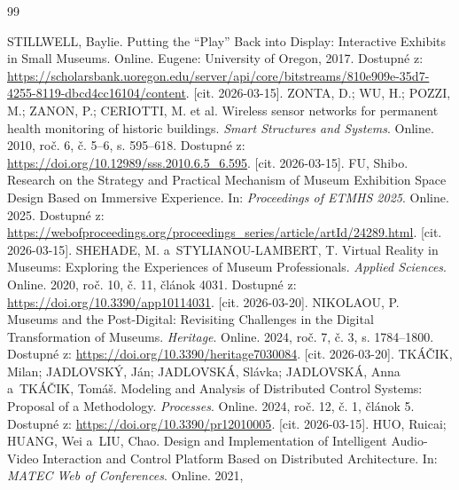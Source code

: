 \raggedbottom %
\begin{thebibliography}{99}

    STILLWELL, Baylie.
    Putting the ``Play'' Back into Display: Interactive Exhibits
    in Small Museums. Online.
    Eugene: University of Oregon, 2017.
    Dostupné z: \url{https://scholarsbank.uoregon.edu/server/api/core/bitstreams/810e909e-35d7-4255-8119-dbcd4cc16104/content}. [cit. 2026-03-15].
    ZONTA, D.; WU, H.; POZZI, M.; ZANON, P.; CERIOTTI, M. et al.
    Wireless sensor networks for permanent health monitoring of
    historic buildings.
    \textit{Smart Structures and Systems}. Online. 2010,
    roč. 6, č. 5--6, s. 595--618.
    Dostupné z: \url{https://doi.org/10.12989/sss.2010.6.5_6.595}. [cit. 2026-03-15].
    FU, Shibo.
    Research on the Strategy and Practical Mechanism of Museum
    Exhibition Space Design Based on Immersive Experience.
    In: \textit{Proceedings of ETMHS 2025}. Online. 2025.
    Dostupné z: \url{https://webofproceedings.org/proceedings_series/article/artId/24289.html}. [cit. 2026-03-15].
    SHEHADE, M. a~STYLIANOU-LAMBERT, T.
    Virtual Reality in Museums: Exploring the Experiences of
    Museum Professionals.
    \textit{Applied Sciences}. Online. 2020, roč. 10, č. 11,
    článok 4031.
    Dostupné z: \url{https://doi.org/10.3390/app10114031}. [cit. 2026-03-20].
    NIKOLAOU, P.
    Museums and the Post-Digital: Revisiting Challenges in the
    Digital Transformation of Museums.
    \textit{Heritage}. Online. 2024, roč. 7, č. 3,
    s. 1784--1800.
    Dostupné z: \url{https://doi.org/10.3390/heritage7030084}. [cit. 2026-03-20].
    TKÁČIK, Milan; JADLOVSKÝ, Ján; JADLOVSKÁ, Slávka;
    JADLOVSKÁ, Anna a~TKÁČIK, Tomáš.
    Modeling and Analysis of Distributed Control Systems:
    Proposal of a Methodology.
    \textit{Processes}. Online. 2024, roč. 12, č. 1,
    článok 5.
    Dostupné z: \url{https://doi.org/10.3390/pr12010005}. [cit. 2026-03-15].
    HUO, Ruicai; HUANG, Wei a~LIU, Chao.
    Design and Implementation of Intelligent Audio-Video
    Interaction and Control Platform Based on Distributed
    Architecture.
    In: \textit{MATEC Web of Conferences}. Online. 2021,

\end{thebibliography}
